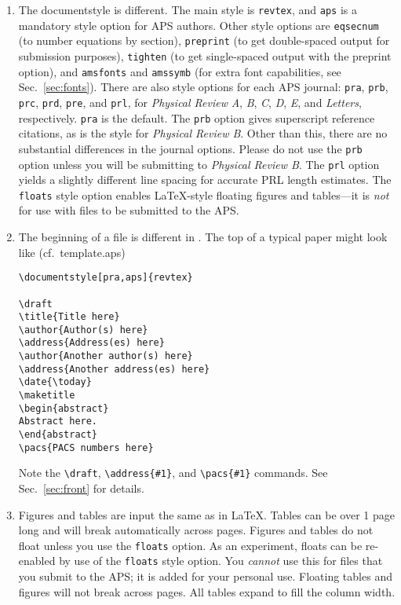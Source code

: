 \begin{enumerate}
\item The documentstyle is different. The main style is \verb+revtex+, and
\verb+aps+ is a mandatory style option for APS authors. Other style options
are \verb+eqsecnum+ (to number equations by section), \verb+preprint+ (to
get double-spaced output for submission purposes), \verb+tighten+ (to get
single-spaced output with the preprint option), and \verb+amsfonts+ and
\verb+amssymb+ (for extra font capabilities, see Sec.\ \ref{sec:fonts}).
There are also style options for each APS journal: \verb+pra+, \verb+prb+,
\verb+prc+, \verb+prd+, \verb+pre+, and \verb+prl+, for {\it Physical
Review\/} {\it A}, {\it B}, {\it C}, {\it D}, {\it E}, and {\it Letters},
respectively. \verb+pra+ is the default. The \verb+prb+ option gives
superscript reference citations, as is the style for {\it Physical Review
B}. Other than this, there are no substantial differences in the journal
options. Please do not use the \verb+prb+ option unless you will be
submitting to {\it Physical Review B}. The \verb+prl+ option yields a
slightly different line spacing for accurate PRL length estimates. The
\verb+floats+ style option enables \LaTeX{}-style floating figures and
tables---it is {\it not\/} for use with files to be submitted to the APS.

\item The beginning of a file is different in \REVTeX. The top of a typical
paper might look like (cf.\ template.aps)
\begin{verbatim}
\documentstyle[pra,aps]{revtex}

\draft
\title{Title here}
\author{Author(s) here}
\address{Address(es) here}
\author{Another author(s) here}
\address{Another address(es) here}
\date{\today}
\maketitle
\begin{abstract}
Abstract here.
\end{abstract}
\pacs{PACS numbers here}
\end{verbatim}
Note the \verb+\draft+, \verb+\address{#1}+, and \verb+\pacs{#1}+ commands.
See Sec.\ \ref{sec:front} for details.

\item Figures and tables are input the same as in \LaTeX{}. Tables can be
over 1 page long and will break automatically across pages. Figures and
tables do not float unless you use the \verb+floats+ option. As an
experiment, floats can be re-enabled by use of the \verb+floats+ style
option. You {\em cannot\/} use this for files that you submit to the APS;
it is added for your personal use. Floating tables and figures will not
break across pages. All tables expand to fill the column width.


\end{enumerate}

